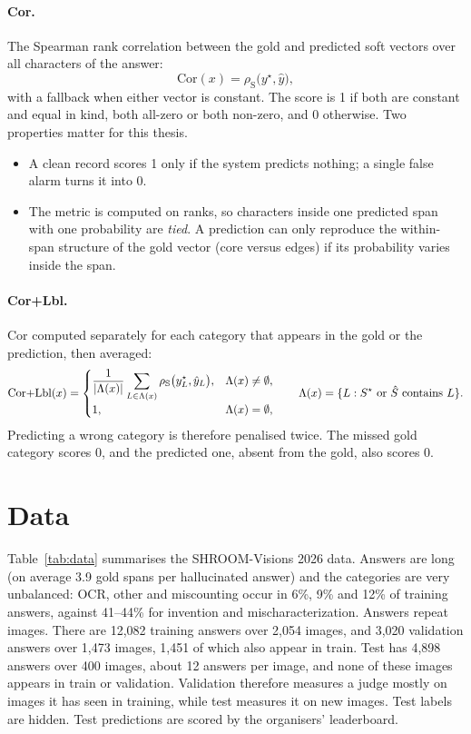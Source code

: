 \paragraph{Cor.} The Spearman rank correlation between the gold and predicted soft vectors over all characters of the answer:
\begin{equation}
    \mathrm{Cor}(x) = \rho_{\mathrm{S}}\big(y^\star, \hat y\big),
\end{equation}
with a fallback when either vector is constant. The score is 1 if both are constant and equal in kind, both all-zero or both non-zero, and 0 otherwise. Two properties matter for this thesis.
\begin{itemize}
    \item A clean record scores 1 only if the system predicts nothing; a single false alarm turns it into 0.
    \item The metric is computed on ranks, so characters inside one predicted span with one probability are \emph{tied}. A prediction can only reproduce the within-span structure of the gold vector (core versus edges) if its probability varies inside the span.
\end{itemize}

\paragraph{Cor+Lbl.} Cor computed separately for each category that appears in the gold or the prediction, then averaged:
\begin{equation}
    \mathrm{Cor{+}Lbl}(x) = \begin{cases}
        \dfrac{1}{|\Lambda(x)|} \displaystyle\sum_{L \in \Lambda(x)} \rho_{\mathrm{S}}\big(y^\star_L, \hat y_L\big), & \Lambda(x) \neq \emptyset, \\[2ex]
        1, & \Lambda(x) = \emptyset,
    \end{cases}
    \qquad \Lambda(x) = \{L : S^\star \text{ or } \hat S \text{ contains } L\}.
\end{equation}
Predicting a wrong category is therefore penalised twice. The missed gold category scores 0, and the predicted one, absent from the gold, also scores 0.

\section{Data}

Table~\ref{tab:data} summarises the SHROOM-Visions 2026 data. Answers are long (on average 3.9 gold spans per hallucinated answer) and the categories are very unbalanced: OCR, other and miscounting occur in 6\%, 9\% and 12\% of training answers, against 41--44\% for invention and mischaracterization. Answers repeat images. There are 12,082 training answers over 2,054 images, and 3,020 validation answers over 1,473 images, 1,451 of which also appear in train. Test has 4,898 answers over 400 images, about 12 answers per image, and none of these images appears in train or validation. Validation therefore measures a judge mostly on images it has seen in training, while test measures it on new images. Test labels are hidden. Test predictions are scored by the organisers' leaderboard.

